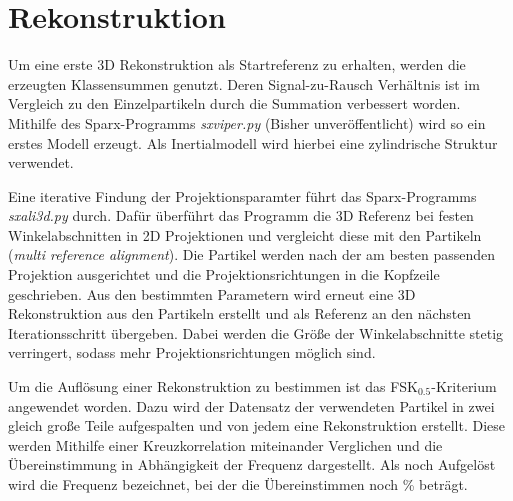 \section{Rekonstruktion} %
\label{sec:rekonstruktion}

Um eine erste 3D Rekonstruktion als Startreferenz zu erhalten, werden die erzeugten Klassensummen genutzt.
Deren Signal-zu-Rausch Verhältnis ist im Vergleich zu den Einzelpartikeln durch die Summation verbessert worden.
Mithilfe des Sparx-Programms \textit{sxviper.py} (Bisher unveröffentlicht) wird so ein erstes Modell erzeugt.
Als Inertialmodell wird hierbei eine zylindrische Struktur verwendet.

Eine iterative Findung der Projektionsparamter führt das Sparx-Programms \textit{sxali3d.py} durch.
Dafür überführt das Programm die 3D Referenz bei festen Winkelabschnitten in 2D Projektionen und vergleicht diese mit den Partikeln (\textit{multi reference alignment}).
Die Partikel werden nach der am besten passenden Projektion ausgerichtet und die Projektionsrichtungen in die Kopfzeile geschrieben.
Aus den bestimmten Parametern wird erneut eine 3D Rekonstruktion aus den Partikeln erstellt und als Referenz an den nächsten Iterationsschritt übergeben.
Dabei werden die Größe der Winkelabschnitte stetig verringert, sodass mehr Projektionsrichtungen möglich sind.

Um die Auflösung einer Rekonstruktion zu bestimmen ist das FSK$_{0.5}$-Kriterium angewendet worden.
Dazu wird der Datensatz der verwendeten Partikel in zwei gleich große Teile aufgespalten und von jedem eine Rekonstruktion erstellt.
Diese werden Mithilfe einer Kreuzkorrelation miteinander Verglichen und die Übereinstimmung in Abhängigkeit der Frequenz dargestellt.
Als noch Aufgelöst wird die Frequenz bezeichnet, bei der die Übereinstimmen noch \unit[50]{\%} beträgt.

\FloatBarrier